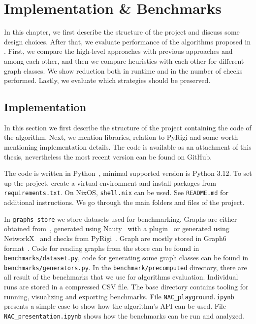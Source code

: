 \chapter{Implementation \& Benchmarks}%
\label{chapter:benchmarks}

\begin{chapterabstract}

	In this chapter, we first describe the structure of the project
	and discuss some design choices.
	After that, we evaluate performance of the algorithms
	proposed in .
	First, we compare the high-level approaches with previous approaches and among each other,
	and then we compare heuristics with each other
	for different  graph classes.
	We show reduction both in runtime and in the number
	of \IsNACColoring{} checks performed.
	Lastly, we evaluate which strategies should be preserved.

\end{chapterabstract}

\section{Implementation}

In this section we first describe the structure of the project containing
the code of the algorithm.
Next, we mention libraries, relation to PyRigi and
some worth mentioning implementation details.
The code is available as an attachment of this thesis,
nevertheless the most recent version can be found on
 GitHub.

The code is written in Python~\cite{python}, minimal supported version is Python 3.12.
To set up the project, create a virtual environment and install packages
from \texttt{requirements.txt}. On NixOS, \texttt{shell.nix} can be used.
See \texttt{README.md} for additional instructions.
We go through the main folders and files of the project.

In \texttt{graphs\_store} we store datasets used for benchmarking.
Graphs are either obtained from~\cite{extremal_graphs},
generated using Nauty~\cite{nauty} with a plugin~\cite{nauty_plugin}
or generated using NetworkX~\cite{networkx} and checks from PyRigi~\cite{pyrigi}.
Graph are mostly stored in Graph6 format~\cite{graph6}.
Code for reading graphs from the store can be found in \texttt{benchmarks/dataset.py},
code for generating some graph classes can be found in  \texttt{benchmarks/generators.py}.
In the \texttt{benchmark/precomputed} directory, there are all result of the benchmarks that
we use for algorithms evaluation.
Individual runs are stored in a compressed CSV file.
%
The base directory contains tooling for running, visualizing and exporting benchmarks.
File \texttt{NAC\_playground.ipynb} presents a simple case
to show how the algorithm's API can be used.
File \texttt{NAC\_presentation.ipynb} shows how the benchmarks can be run and analyzed.

